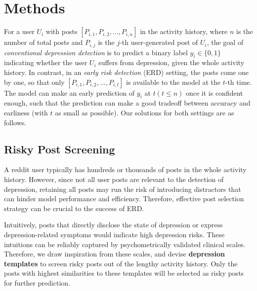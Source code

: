 \section{Methods}

For a user $U_i$ with posts $[P_{i,1}, P_{i,2}, ..., P_{i,n}]$ in the activity history, where $n$ is the number of total posts and $P_{i,j}$ is the $j$-th user-generated post of $U_i$, the goal of \textit{conventional depression detection} is to predict a binary label $y_i \in \{0, 1\}$ indicating whether the user $U_i$ suffers from depression, given the whole activity history. In contrast, in an \textit{early risk detection} (ERD) setting, the posts come one by one, so that only $[P_{i,1}, P_{i,2}, ..., P_{i,t}]$ is available to the model at the $t$-th time. The model can make an early prediction of $y_i$ at $t (t \leq n)$ once it is confident enough, such that the prediction can make a good tradeoff between accuracy and earliness (with $t$ as small as possible). Our solutions for both settings are as follows. 

\subsection{Risky Post Screening}
\label{sec:screening}

A reddit user typically has hundreds or thousands of posts in the whole activity history. However, since not all user posts are relevant to the detection of depression, retaining all posts may run the risk of introducing distractors that can hinder model performance and efficiency. Therefore, effective post selection strategy can be crucial to the success of ERD. 

Intuitively, posts that directly disclose the state of depression or express depression-related symptoms would indicate high depression risks. These intuitions can be reliably captured by psychometrically validated clinical scales. Therefore, we draw inspiration from these scales, and devise \textbf{depression templates} to screen risky posts out of the lengthy activity history. Only the posts with highest similarities to these templates will be selected as risky posts for further prediction.

